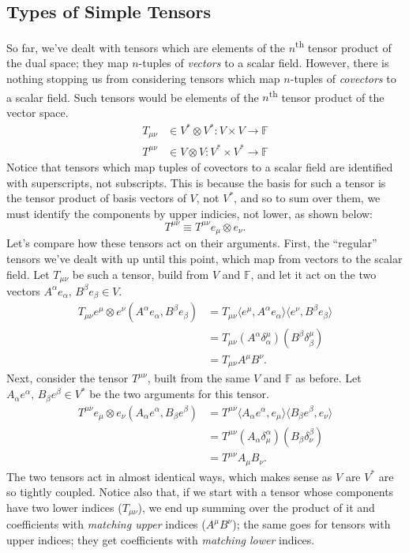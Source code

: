\subsection{Types of Simple Tensors}
So far, we've dealt with tensors which are elements of the $n$\textsuperscript{th} tensor product of the dual space; they map $n$-tuples of \emph{vectors} to a scalar field.
However, there is nothing stopping us from considering tensors which map $n$-tuples of \emph{covectors} to a scalar field.
Such tensors would be elements of the $n$\textsuperscript{th} tensor product of the vector space.
\begin{align*}
    T_{\mu\nu} &\in V^* \otimes V^* : V \times V \to \mathbb{F} \tag{vectors $\to$ scalar field} \\
    T^{\mu\nu} &\in V \otimes V : V^* \times V^* \to \mathbb{F} \tag{covectors $\to$ scalar field}
\end{align*}
Notice that tensors which map tuples of covectors to a scalar field are identified with superscripts, not subscripts.
This is because the basis for such a tensor is the tensor product of basis vectors of $V$, not $V^*$, and so to sum over them, we must identify the components by upper indicies, not lower, as shown below:
\[ T^{\mu\nu} \equiv T^{\mu\nu} e_\mu \otimes e_\nu. \]
Let's compare how these tensors act on their arguments. First, the ``regular'' tensors we've dealt with up until this point, which map from vectors to the scalar field. Let $T_{\mu\nu}$ be such a tensor, build from $V$ and $\mathbb{F}$, and let it act on the two vectors $A^\alpha e_\alpha,\,B^\beta e_\beta \in V$.
\begin{align*}
    T_{\mu\nu} e^\mu \otimes e^\nu \left( A^\alpha e_\alpha, B^\beta e_\beta \right) &= T_{\mu\nu} \langle e^\mu, A^\alpha e_\alpha \rangle \langle e^\nu, B^\beta e_\beta \rangle \\
    &= T_{\mu\nu} \left( A^\alpha \delta^\mu_\alpha \right) \left( B^\beta \delta^\mu_\beta \right) \\
    &= T_{\mu\nu}A^\mu B^\nu.
\end{align*}
Next, consider the tensor $T^{\mu\nu}$, built from the same $V$ and $\mathbb{F}$ as before. Let $A_\alpha e^\alpha,\,B_\beta e^\beta \in V^*$ be the two arguments for this tensor. 
\begin{align*}
    T^{\mu\nu} e_\mu \otimes e_\nu \left(A_\alpha e^\alpha,B_\beta e^\beta\right) &= T^{\mu\nu} \langle A_\alpha e^\alpha, e_\mu \rangle \langle B_\beta e^\beta, e_\nu \rangle \\
    &= T^{\mu\nu} \left(A_\alpha \delta^\alpha_\mu\right) \left(B_\beta \delta^\beta_\nu\right) \\
    &= T^{\mu\nu}A_\mu B_\nu.
\end{align*}
The two tensors act in almost identical ways, which makes sense as $V$ are $V^*$ are so tightly coupled.
Notice also that, if we start with a tensor whose components have two lower indices ($T_{\mu\nu}$), we end up summing over the product of it and coefficients with \emph{matching upper} indices ($A^\mu B^\nu$); the same goes for tensors with upper indices; they get coefficients with \emph{matching lower} indices.

